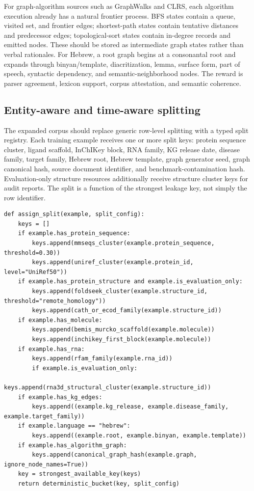 \documentclass[11pt]{article}
\newcommand{\1}{\mathbf{1}}
\begin{document}
For graph-algorithm sources such as GraphWalks and CLRS, each algorithm execution already has a natural frontier process. BFS states contain a queue, visited set, and frontier edges; shortest-path states contain tentative distances and predecessor edges; topological-sort states contain in-degree records and emitted nodes. These should be stored as intermediate graph states rather than verbal rationales. For Hebrew, a root graph begins at a consonantal root and expands through binyan/template, diacritization, lemma, surface form, part of speech, syntactic dependency, and semantic-neighborhood nodes. The reward is parser agreement, lexicon support, corpus attestation, and semantic coherence.

\subsection{Entity-aware and time-aware splitting}
\label{sec:entity-aware-splits}

The expanded corpus should replace generic row-level splitting with a typed split registry. Each training example receives one or more split keys: protein sequence cluster, ligand scaffold, InChIKey block, RNA family, KG release date, disease family, target family, Hebrew root, Hebrew template, graph generator seed, graph canonical hash, source document identifier, and benchmark-contamination hash. Evaluation-only structure resources additionally receive structure cluster keys for audit reports. The split is a function of the strongest leakage key, not simply the row identifier.

\begin{lstlisting}[caption={Entity-aware split assignment for multimodal graph examples.}]
def assign_split(example, split_config):
    keys = []
    if example.has_protein_sequence:
        keys.append(mmseqs_cluster(example.protein_sequence, threshold=0.30))
        keys.append(uniref_cluster(example.protein_id, level="UniRef50"))
    if example.has_protein_structure and example.is_evaluation_only:
        keys.append(foldseek_cluster(example.structure_id, threshold="remote_homology"))
        keys.append(cath_or_ecod_family(example.structure_id))
    if example.has_molecule:
        keys.append(bemis_murcko_scaffold(example.molecule))
        keys.append(inchikey_first_block(example.molecule))
    if example.has_rna:
        keys.append(rfam_family(example.rna_id))
        if example.is_evaluation_only:
            keys.append(rna3d_structural_cluster(example.structure_id))
    if example.has_kg_edges:
        keys.append((example.kg_release, example.disease_family, example.target_family))
    if example.language == "hebrew":
        keys.append((example.root, example.binyan, example.template))
    if example.has_algorithm_graph:
        keys.append(canonical_graph_hash(example.graph, ignore_node_names=True))
    key = strongest_available_key(keys)
    return deterministic_bucket(key, split_config)
\end{lstlisting}
\end{document}
